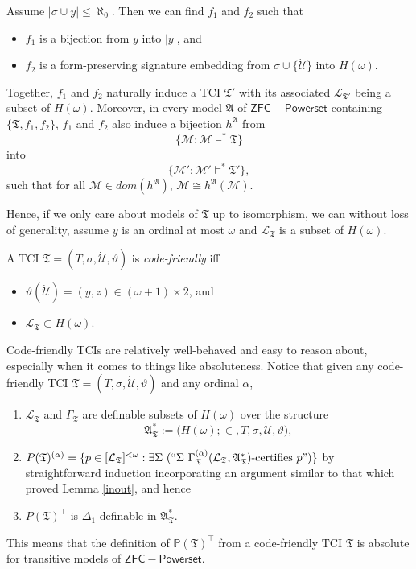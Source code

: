 \documentclass[12pt]{article}
\numberwithin{equation}{section}
\begin{document}
Assume $|\sigma \cup y| \leq \aleph_0$. Then we can find $f_1$ and $f_2$ such that
\begin{itemize}
    \item $f_1$ is a bijection from $y$ into $|y|$, and
    \item $f_2$ is a form-preserving signature embedding from $\sigma \cup \{\dot{\mathcal{U}}\}$ into $H(\omega)$.
\end{itemize}
Together, $f_1$ and $f_2$ naturally induce a TCI $\mathfrak{T}'$ with its associated $\mathcal{L}_{\mathfrak{T}'}$ being a subset of $H(\omega)$. Moreover, in every model $\mathfrak{A}$ of $\mathsf{ZFC - Powerset}$ containing $\{\mathfrak{T}, f_1, f_2\}$, $f_1$ and $f_2$ also induce a bijection $h^{\mathfrak{A}}$ from $$\{\mathcal{M} : \mathcal{M} \models^* \mathfrak{T}\}$$ into $$\{\mathcal{M}' : \mathcal{M}' \models^* \mathfrak{T}'\},$$ such that for all $\mathcal{M} \in dom(h^{\mathfrak{A}})$, $\mathcal{M} \cong h^{\mathfrak{A}}(\mathcal{M})$. 

Hence, if we only care about models of $\mathfrak{T}$ up to isomorphism, we can without loss of generality, assume $y$ is an ordinal at most $\omega$ and $\mathcal{L}_{\mathfrak{T}}$ is a subset of $H(\omega)$.

\begin{defi}
A TCI $\mathfrak{T} = (T, \sigma, \dot{\mathcal{U}}, \vartheta)$ is \emph{code-friendly} iff 
\begin{itemize}
    \item $\vartheta(\dot{\mathcal{U}}) = (y, z) \in (\omega + 1) \times 2$, and 
    \item $\mathcal{L}_{\mathfrak{T}} \subset H(\omega)$.
\end{itemize}
\end{defi}

Code-friendly TCIs are relatively well-behaved and easy to reason about, especially when it comes to things like absoluteness. Notice that given any code-friendly TCI $\mathfrak{T} = (T, \sigma, \dot{\mathcal{U}}, \vartheta)$ and any ordinal $\alpha$,
\begin{enumerate}[leftmargin=40pt, label=(CF\arabic*)]
    \item\label{cf1} $\mathcal{L}_{\mathfrak{T}}$ and $\Gamma_{\mathfrak{T}}$ are definable subsets of $H(\omega)$ over the structure $$\mathfrak{A}^*_{\mathfrak{T}} := \mathfrak(H(\omega); \in, T, \sigma, \dot{\mathcal{U}}, \vartheta),$$
    \item $P(\mathfrak{T})^{(\alpha)} = \{p \in [\mathcal{L}_{\mathfrak{T}}]^{< \omega} : \exists \Sigma \ (``\Sigma \ \Gamma_{\mathfrak{T}}^{(\alpha)} (\mathcal{L}_{\mathfrak{T}}, \mathfrak{A}^*_{\mathfrak{T}})\text{-certifies } p")\}$ by straightforward induction incorporating an argument similar to that which proved Lemma \ref{inout}, and hence
    \item $P(\mathfrak{T})^{\top}$ is $\Delta_1$-definable in $\mathfrak{A}^*_{\mathfrak{T}}$.
\end{enumerate}
This means that the definition of $\mathbb{P}(\mathfrak{T})^{\top}$ from a code-friendly TCI $\mathfrak{T}$ is absolute for transitive models of $\mathsf{ZFC - Powerset}$.
\end{document}
